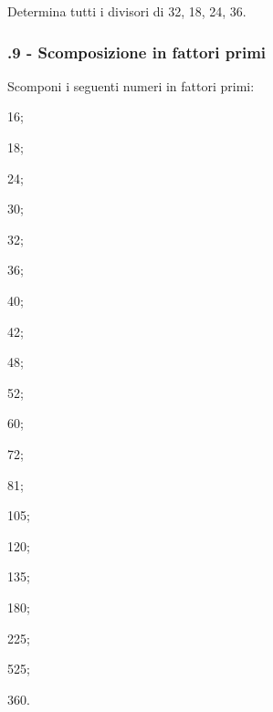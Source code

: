 \pagebreak
\begin{esercizio}
\label{ese:1.18}
 Determina tutti i divisori di 32, 18, 24, 36.
\end{esercizio}

\subsubsection*{\thechapter.9 - Scomposizione in fattori primi}

\begin{esercizio}[\Ast]
\label{ese:1.19}
Scomponi i seguenti numeri in fattori primi:
 \begin{multicols}{5}
 \begin{enumeratea}
 \item 16;
 \item 18;
 \item 24;
 \item 30;
 \item 32;
 \item 36;
 \item 40;
 \item 42;
 \item 48;
 \item 52;
 \item 60;
 \item 72;
 \item 81;
 \item 105;
 \item 120;
 \item 135;
 \item 180;
 \item 225;
 \item 525;
 \item 360.
 \end{enumeratea}
 \end{multicols}
\end{esercizio}


